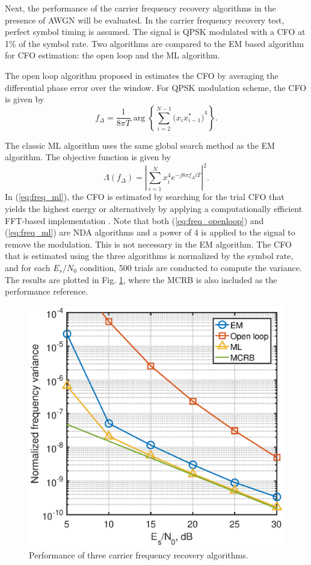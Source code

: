 \documentclass[journal,comsoc,onecolumn, 12pt,draftclsnofoot]{IEEEtran}
\begin{document}
Next, the performance of the carrier frequency recovery algorithms in the presence of AWGN will be evaluated.
In the carrier frequency recovery test, perfect symbol timing is assumed.
The signal is QPSK modulated with a CFO at 1\% of the symbol rate.
Two algorithms are compared to the EM based algorithm for CFO estimation:
the open loop and the ML algorithm.

The open loop algorithm proposed in \cite{Chuang1991} estimates the CFO  by averaging the differential phase error over the window.
For QPSK modulation scheme, the CFO is given by \cite{mengali1997synchronization}
\begin{equation}
f_\Delta = \frac{1}{8 \pi T} \arg \left\{ {\sum\limits_{i = 2}^{{N} - 1} {{{\big( {x_i x^*_{i-1}} \big)}^4}} } \right\}.
\label{eq:freq_openloop}
\end{equation}

The classic ML algorithm uses the same global search method as the EM algorithm.
The objective function is given by 
\begin{equation}
\Lambda (f_\Delta)=\left| \sum\limits_{i = 1}^N {{{ {{x^4_i}e^{-j8\pi f_\Delta i T}}}}} \right|^2. 
\label{eq:freq_ml}
\end{equation}
In (\ref{eq:freq_ml}), the CFO is estimated by searching for the trial CFO that yields the highest energy or alternatively by applying a computationally efficient FFT-based implementation \cite{Wang2004}.
Note that both (\ref{eq:freq_openloop}) and (\ref{eq:freq_ml}) are NDA algorithms and a power of 4 is applied to the signal to remove the modulation.
This is not necessary in the EM algorithm.
The CFO that is estimated using the three algorithms is normalized by the symbol rate,
and for each \(E_s/N_0\) condition, 500 trials are conducted to compute the variance.
The results are plotted in Fig. \ref{fig:per_freq}, where the MCRB is also included as the performance reference.

\begin{figure}[ht]
\centering
\includegraphics[width=3 in]{pic/per_freq.eps}
\caption{Performance of three carrier frequency recovery algorithms.}
\label{fig:per_freq} 
\end{figure} 
\end{document}
